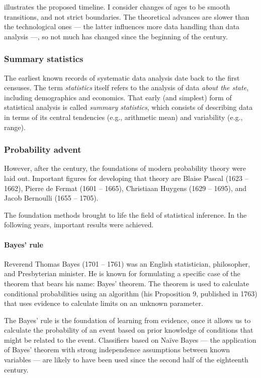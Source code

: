  illustrates the proposed timeline.  I consider changes of
ages to be smooth transitions, and not strict boundaries.  The theoretical advances are
slower than the technological ones --- the latter influences more data handling than data
analysis ---, so not much has changed since the beginning of the  century.

\subsubsection{Summary statistics}

The earliest known records of systematic data analysis date back to the first censuses.
The term \emph{statistics} itself refers to the analysis of data \emph{about the state},
including demographics and economics.  That early (and simplest) form of statistical
analysis is called \emph{summary statistics}, which consists of describing data in terms
of its central tendencies (e.g., arithmetic mean) and variability (e.g., range).

\subsubsection{Probability advent}

However, after the  century, the foundations of modern probability theory were
laid out.  Important figures for developing that theory are Blaise Pascal (1623
-- 1662), Pierre de Fermat (1601 -- 1665), Christiaan Huygens (1629 -- 1695), and Jacob
Bernoulli (1655 -- 1705).

The foundation methods brought to life the field of statistical inference. In the
following years, important results were achieved.

\paragraph{Bayes' rule}

Reverend Thomas Bayes (1701 -- 1761) was an English statistician, philosopher, and
Presbyterian minister.  He is known for formulating a specific case of the theorem that
bears his name: Bayes' theorem.  The theorem is used to calculate conditional
probabilities using an algorithm (his Proposition 9, published in 1763) that uses evidence to calculate
limits on an unknown parameter.

The Bayes' rule is the foundation of learning from evidence, once it allows us to
calculate the probability of an event based on prior knowledge of conditions that might be
related to the event.  Classifiers based on Naïve Bayes --- the application of Bayes'
theorem with strong independence assumptions between known variables --- are likely to have
been used since the second half of the eighteenth century.

